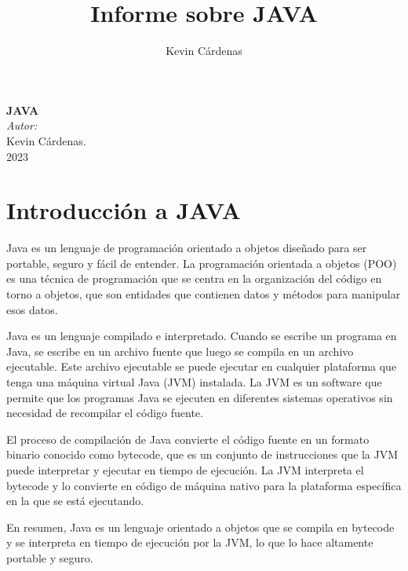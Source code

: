 \documentclass[executivepaper]{article}
\title{Informe sobre JAVA}
\author{Kevin Cárdenas}
\begin{document}
\begin{titlepage}
    \begin{center}
        {\Huge \textbf{JAVA}}
        \\[18cm]

        \large\emph{Autor:}\\
        Kevin Cárdenas.
        \\[1cm]
        {\large 2023}
    \end{center}
\end{titlepage}

\newpage
\tableofcontents
\newpage
\section{Introducción a JAVA}
Java es un lenguaje de programación orientado a objetos diseñado para ser portable, seguro y fácil de entender. La programación orientada a objetos (POO) es una técnica de programación que se centra en la organización del código en torno a objetos, que son entidades que contienen datos y métodos para manipular esos datos.

Java es un lenguaje compilado e interpretado. Cuando se escribe un programa en Java, se escribe en un archivo fuente que luego se compila en un archivo ejecutable. Este archivo ejecutable se puede ejecutar en cualquier plataforma que tenga una máquina virtual Java (JVM) instalada. La JVM es un software que permite que los programas Java se ejecuten en diferentes sistemas operativos sin necesidad de recompilar el código fuente.

El proceso de compilación de Java convierte el código fuente en un formato binario conocido como bytecode, que es un conjunto de instrucciones que la JVM puede interpretar y ejecutar en tiempo de ejecución. La JVM interpreta el bytecode y lo convierte en código de máquina nativo para la plataforma específica en la que se está ejecutando.

En resumen, Java es un lenguaje orientado a objetos que se compila en bytecode y se interpreta en tiempo de ejecución por la JVM, lo que lo hace altamente portable y seguro.
\end{document}
